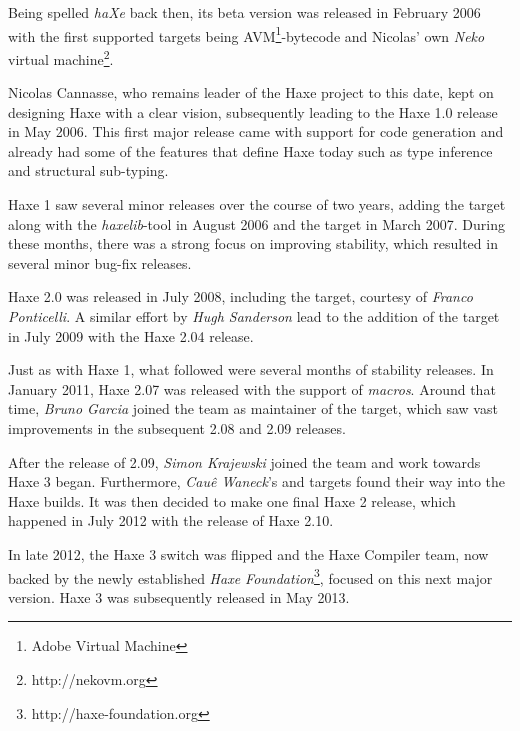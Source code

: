 Being spelled \emph{haXe} back then, its beta version was released in February 2006 with the first supported targets being AVM\footnote{Adobe Virtual Machine}-bytecode and Nicolas' own \emph{Neko} virtual machine\footnote{http://nekovm.org}.

Nicolas Cannasse, who remains leader of the Haxe project to this date, kept on designing Haxe with a clear vision, subsequently leading to the Haxe 1.0 release in May 2006. This first major release came with support for  code generation and already had some of the features that define Haxe today such as type inference and structural sub-typing.

Haxe 1 saw several minor releases over the course of two years, adding the  target along with the \emph{haxelib}-tool in August 2006 and the  target in March 2007. During these months, there was a strong focus on improving stability, which resulted in several minor bug-fix releases.

Haxe 2.0 was released in July 2008, including the  target, courtesy of \emph{Franco Ponticelli}. A similar effort by \emph{Hugh Sanderson} lead to the addition of the  target in July 2009 with the Haxe 2.04 release.

Just as with Haxe 1, what followed were several months of stability releases. In January 2011, Haxe 2.07 was released with the support of \emph{macros}. Around that time, \emph{Bruno Garcia} joined the team as maintainer of the  target, which saw vast improvements in the subsequent 2.08 and 2.09 releases.

After the release of 2.09, \emph{Simon Krajewski} joined the team and work towards Haxe 3 began. Furthermore, \emph{Cau\^{e} Waneck}'s  and  targets found their way into the Haxe builds. It was then decided to make one final Haxe 2 release, which happened in July 2012 with the release of Haxe 2.10.

In late 2012, the Haxe 3 switch was flipped and the Haxe Compiler team, now backed by the newly established \emph{Haxe Foundation}\footnote{http://haxe-foundation.org}, focused on this next major version. Haxe 3 was subsequently released in May 2013.
